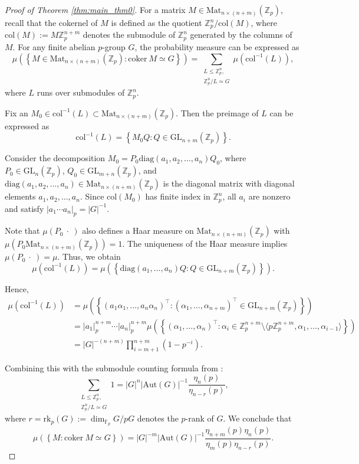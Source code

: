 \documentclass[a4]{amsart}
\newcommand{\Mat}{{\mathrm{Mat}}}
\newcommand{\Aut}{{\mathrm{Aut}}}
\newcommand{\rk}{\mathrm{rk}}
\newcommand{\col}{\mathrm{col}}
\newcommand{\coker}{\mathrm{coker~}}
\newcommand{\GL}{\mathrm{GL}}
\theoremstyle{remark} \newtheorem{remark}[theorem]{Remark}
\begin{document}
\begin{proof}[Proof of Theorem \ref{thm:main_thm0}]
For a matrix $M \in \Mat_{n \times (n + m)}(\mathbb{Z}_p)$, recall that the cokernel of $M$ is defined as the quotient $\mathbb{Z}_p^n / \col(M)$, where $\col(M) := M \mathbb{Z}_p^{n + m}$ denotes the submodule of $\mathbb{Z}_p^n$ generated by the columns of $M$. For any finite abelian $p$-group $G$, the probability measure can be expressed as
\[
\mu\left(\left\{ M \in \Mat_{n \times (n + m)}(\mathbb{Z}_p) : \coker M \simeq G \right\}\right) = \sum_{\substack{L \leq \mathbb{Z}_p^n, \\ \mathbb{Z}_p^n / L \simeq G}} \mu(\col^{-1}(L)),
\]
where $L$ runs over submodules of $\mathbb{Z}_p^n$.

Fix an $M_0 \in \col^{-1}(L) \subset \Mat_{n \times (n + m)}(\mathbb{Z}_p)$. Then the preimage of $L$ can be expressed as
\[
\col^{-1}(L) = \left\{ M_0 Q : Q \in \GL_{n + m}(\mathbb{Z}_p) \right\}.
\]

Consider the decomposition $M_0 = P_0 \mathrm{diag}(a_1, a_2, \dots, a_n) Q_0$, where $P_0 \in \GL_n(\mathbb{Z}_p)$, $Q_0 \in \GL_{m + n}(\mathbb{Z}_p)$, and $\mathrm{diag}(a_1, a_2, \dots, a_n) \in \Mat_{n \times (n + m)}(\mathbb{Z}_p)$ is the diagonal matrix with diagonal elements $a_1, a_2, \dots, a_n$. Since $\col(M_0)$ has finite index in $\mathbb{Z}_p^n$, all $a_i$ are nonzero and satisfy $|a_1 \cdots a_n|_p = |G|^{-1}$.

Note that $\mu(P_0 ~\cdot~)$ also defines a Haar measure on $\Mat_{n \times (n + m)}(\mathbb{Z}_p)$ with $\mu(P_0 \Mat_{n \times (n + m)}(\mathbb{Z}_p)) = 1$. The uniqueness of the Haar measure implies $\mu(P_0 ~\cdot~) = \mu$. Thus, we obtain
\[
\mu(\col^{-1}(L)) = \mu\left(\left\{ \mathrm{diag}(a_1, \dots, a_n) Q : Q \in \GL_{n + m}(\mathbb{Z}_p) \right\}\right).
\]

Hence,
\[
\begin{split}
\mu(\col^{-1}(L)) 
&= \mu\left( \left\{ (a_1 \alpha_1, \dots, a_n \alpha_n)^\top : (\alpha_1, \dots, \alpha_{n + m})^\top \in \GL_{n + m}(\mathbb{Z}_p) \right\} \right) \\
&= |a_1|_p^{n + m} \cdots |a_n|_p^{n + m}  \mu\left( \left\{ (\alpha_1, \dots, \alpha_n)^\top : \alpha_i \in \mathbb{Z}_p^{n + m} \setminus \langle p \mathbb{Z}_p^{n + m}, \alpha_1, \dots, \alpha_{i - 1} \rangle \right\} \right) \\
&= |G|^{-(n + m)} \prod_{i = m + 1}^{n + m} (1 - p^{-i}).
\end{split}
\]

Combining this with the submodule counting formula from \cite[Proposition 3.1]{cohen1984Heuristics}:
\[
\sum_{\substack{L \leq \mathbb{Z}_p^n, \\ \mathbb{Z}_p^n / L \simeq G}} 1 = |G|^n |\Aut(G)|^{-1}  \frac{\eta_n(p)}{\eta_{n - r}(p)},
\]
where $r = \rk_p(G) := \dim_{\mathbb{F}_p} G / pG$ denotes the $p$-rank of $G$. We conclude that
\[
\mu\left(\left\{ M : \coker M \simeq G \right\}\right) = |G|^{-m} |\Aut(G)|^{-1} \frac{\eta_{n + m}(p) \eta_n(p)}{\eta_m(p) \eta_{n - r}(p)}.
\]


\end{proof}
\end{document}
